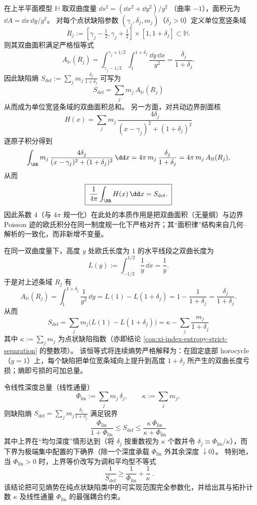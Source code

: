 \begin{proposition}
在上半平面模型 \(\mathbb{H}\) 取双曲度量
\(
\dd s^{2}=(\dd x^{2}+\dd y^{2})/y^{2}
\)
（曲率 \(-1\)），面积元为 \(\dd A=\dd x\,\dd y/y^{2}\)。
对每个点状缺陷参数 \((\gamma_j,\delta_j,m_j)\)（\(\delta_j>0\)）定义单位宽竖条域
\[
R_j:=[\gamma_j-\tfrac12,\gamma_j+\tfrac12]\times[1,1+\delta_j]\subset\mathbb{H}.
\]
则其双曲面积满足严格恒等式
\[
A_{\mathbb{H}}(R_j)
=\int_{\gamma_j-1/2}^{\gamma_j+1/2}\int_{1}^{1+\delta_j}\frac{\dd y\,\dd x}{y^{2}}
=\frac{\delta_j}{1+\delta_j}.
\]
因此缺陷熵
\(
S_{\mathrm{def}}:=\sum_{j}m_j\,\frac{\delta_j}{1+\delta_j}
 \)
可写为
\[
\boxed{\;
S_{\mathrm{def}}=\sum_{j}m_j\,A_{\mathbb{H}}(R_j)\;}
\]
从而成为单位宽竖条域的双曲面积总和。
另一方面，对共动边界剖面核
\[
H(x)=\sum_{j} m_j\,\frac{4\delta_j}{(x-\gamma_j)^2+(1+\delta_j)^2}
\]
逐原子积分得到
\[
\int_{\RR} m_j\,\frac{4\delta_j}{(x-\gamma_j)^2+(1+\delta_j)^2}\,\dd x
=4\pi\,m_j\,\frac{\delta_j}{1+\delta_j}
=4\pi\,m_j\,A_{\mathbb{H}}(R_j),
\]
从而
\[
\boxed{\;
\frac{1}{4\pi}\int_{\RR}H(x)\,\dd x=S_{\mathrm{def}}.\;}
\]
因此系数 \(4\)（与 \(4\pi\) 规一化）在此处的本质作用是把双曲面积（无量纲）与边界 Poisson 迹的欧氏积分在同一制度规一化下严格对齐；其“面积律”结构来自几何--解析的一致化，而非新增不变量。
\end{proposition}

\begin{proposition}
在同一双曲度量下，高度 \(y\) 处欧氏长度为 \(1\) 的水平线段之双曲长度为
\[
L(y):=\int_{-1/2}^{1/2}\frac{1}{y}\,\dd x=\frac{1}{y}.
\]
于是对上述条域 \(R_j\) 有
\[
A_{\mathbb{H}}(R_j)=\int_{1}^{1+\delta_j}\frac{1}{y^{2}}\,\dd y
=L(1)-L(1+\delta_j)
=1-\frac{1}{1+\delta_j}
=\frac{\delta_j}{1+\delta_j}.
\]
从而
\[
\boxed{\;
S_{\mathrm{def}}
=\sum_{j}m_j\bigl(L(1)-L(1+\delta_j)\bigr)
=\kappa-\sum_{j}\frac{m_j}{1+\delta_j}\;}
\]
其中 \(\kappa:=\sum_j m_j\) 为点状缺陷指数（亦即结论 \ref{con:xi-index-entropy-strict-separation} 的整数项）。
该恒等式将连续熵势严格解释为：在固定底部 horocycle（\(y=1\)）上，每个缺陷把单位宽条域向上提升到高度 \(1+\delta_j\) 所产生的双曲长度亏损；熵即亏损的可加总量。
\end{proposition}

\begin{proposition}[熵--通量--指数的最优可行区间与调和平均下界]
令线性深度总量（线性通量）
\[
\Phi_{\mathrm{lin}}:=\sum_{j}m_j\,\delta_j,
\qquad
\kappa:=\sum_{j}m_j,
\]
则缺陷熵 \(S_{\mathrm{def}}=\sum_j m_j\frac{\delta_j}{1+\delta_j}\) 满足锐界
\[
\boxed{\;
\frac{\Phi_{\mathrm{lin}}}{1+\Phi_{\mathrm{lin}}}
\le
S_{\mathrm{def}}
\le
\frac{\kappa\,\Phi_{\mathrm{lin}}}{\kappa+\Phi_{\mathrm{lin}}}\;}
\]
其中上界在“均匀深度”情形达到（将 \(\delta_j\) 按重数视为 \(\kappa\) 个数并令 \(\delta_j\equiv \Phi_{\mathrm{lin}}/\kappa\)），而下界为极端集中配置的下确界（除一个深度承载 \(\Phi_{\mathrm{lin}}\) 外其余深度 \(\downarrow 0\)）。
特别地，当 \(\Phi_{\mathrm{lin}}>0\) 时，上界等价改写为调和平均型不等式
\[
\boxed{\;
\frac{1}{S_{\mathrm{def}}}\ge \frac{1}{\Phi_{\mathrm{lin}}}+\frac{1}{\kappa}\; }.
\]
该结论把可见熵势在纯点状缺陷类中的可实现范围完全参数化，并给出其与拓扑计数 \(\kappa\) 及线性通量 \(\Phi_{\mathrm{lin}}\) 的最强耦合约束。
\end{proposition}

